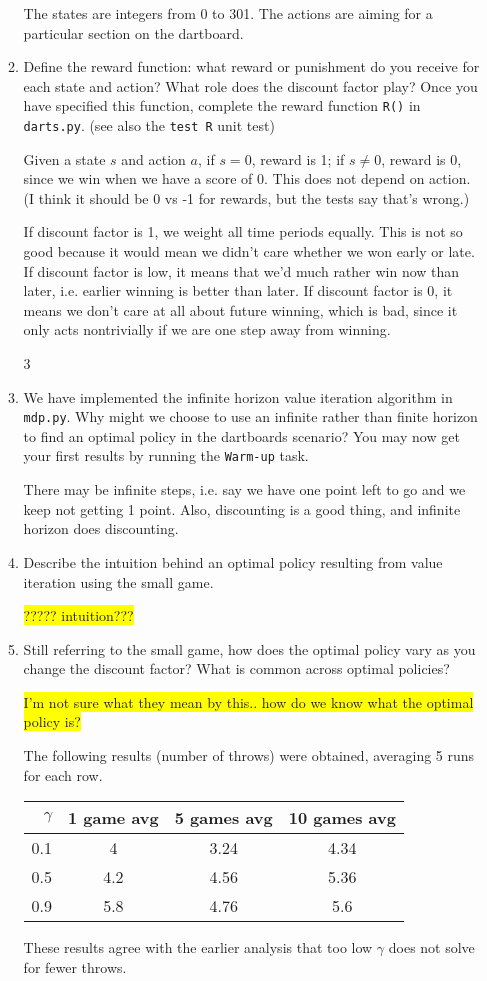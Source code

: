 \documentclass{article}
\newcommand{\edit}[1]{\colorbox{Yellow}{#1}}
\begin{document}
\begin{enumerate}
\begin{enumerate}
  The states are integers from 0 to 301. The actions are aiming for a
  particular section on the dartboard.  

  \item {Define the reward function: what reward or punishment
  do you receive for each state and action? What role does the discount
  factor play? Once you have specified this function, complete the
  reward function \texttt{R()} in \texttt{darts.py}. (see also the 
  \texttt{test R} unit test)}

  Given a state $s$ and action $a$, if $s=0$, reward is 1; if $s\neq 0$,
  reward is 0, since we win when we have a score of 0. This does not
  depend on action. 
  (I think it should be 0 vs -1 for rewards, but the tests say that's wrong.)

  If discount factor is 1, we weight all time periods equally. This is
  not so good because it would mean we didn't care whether we won early
  or late. If discount factor is low, it means that we'd much rather win
  now than later, i.e. earlier winning is better than later. 
  If discount factor is 0, it means we don't care at all about future
  winning, which is bad, since it only acts nontrivially if we are one
  step away from winning. 

  \setcounter{enumii}3
  \item {We have implemented the infinite horizon value iteration
  algorithm in \texttt{mdp.py}. Why might we choose to use an infinite rather
  than finite horizon to find an optimal policy in the dartboards scenario? 
  You may now get your first results by running the \texttt{Warm-up} task.}

  There may be infinite steps, i.e. say we have one point left to go
  and we keep not getting 1 point. 
  Also, discounting is a good thing, and infinite horizon does discounting.  
  
  \item {Describe the intuition behind an optimal policy resulting
  from value iteration using the small game.}

  \edit{????? intuition???}

  \item {Still referring to the small game, how does the optimal
  policy vary as you change the discount factor? What is common
  across optimal policies?}

  \edit{I'm not sure what they mean by this.. how do we know what the optimal policy is?}

  The following results (number of throws) were obtained, averaging 5 runs for each row.
  \begin{tabular}{r|c c c}
  $\gamma$ & 1 game avg & 5 games avg & 10 games avg \\
  \hline
  0.1 & 4 & 3.24 & 4.34 \\
  0.5 & 4.2 & 4.56 & 5.36 \\
  0.9 & 5.8 & 4.76 & 5.6 \\
  \end{tabular}
  These results agree with the earlier analysis that too low $\gamma$
  does not solve for fewer throws. 


\end{enumerate}
\end{enumerate}
\end{document}
